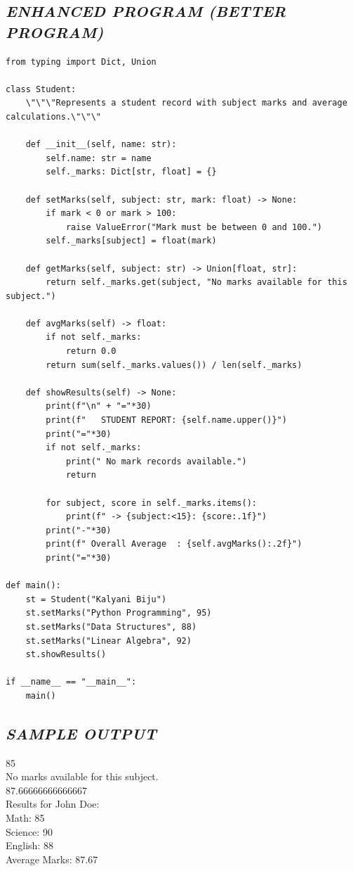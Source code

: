 \documentclass[11pt,a4paper]{article}
\begin{document}
\subsection*{\textit{ENHANCED PROGRAM (BETTER PROGRAM)}}
\begin{lstlisting}[style=pythonstyle]
from typing import Dict, Union

class Student:
    \"\"\"Represents a student record with subject marks and average calculations.\"\"\"
    
    def __init__(self, name: str):
        self.name: str = name
        self._marks: Dict[str, float] = {}

    def setMarks(self, subject: str, mark: float) -> None:
        if mark < 0 or mark > 100:
            raise ValueError("Mark must be between 0 and 100.")
        self._marks[subject] = float(mark)

    def getMarks(self, subject: str) -> Union[float, str]:
        return self._marks.get(subject, "No marks available for this subject.")

    def avgMarks(self) -> float:
        if not self._marks:
            return 0.0
        return sum(self._marks.values()) / len(self._marks)

    def showResults(self) -> None:
        print(f"\n" + "="*30)
        print(f"   STUDENT REPORT: {self.name.upper()}")
        print("="*30)
        if not self._marks:
            print(" No mark records available.")
            return
        
        for subject, score in self._marks.items():
            print(f" -> {subject:<15}: {score:.1f}")
        print("-"*30)
        print(f" Overall Average  : {self.avgMarks():.2f}")
        print("="*30)

def main():
    st = Student("Kalyani Biju")
    st.setMarks("Python Programming", 95)
    st.setMarks("Data Structures", 88)
    st.setMarks("Linear Algebra", 92)
    st.showResults()

if __name__ == "__main__":
    main()
\end{lstlisting}

\subsection*{\textit{SAMPLE OUTPUT}}
\begin{tcolorbox}[colback=black!85,colframe=navyblue,title=\textbf{Terminal Output},coltitle=white,fonttitle=\bfseries\small]
\small\ttfamily\color{green!30!white}
85\\
No marks available for this subject.\\
87.66666666666667\\
Results for John Doe:\\
Math: 85\\
Science: 90\\
English: 88\\
Average Marks: 87.67
\end{tcolorbox}
\end{document}
